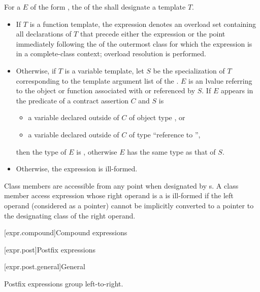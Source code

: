 \pnum
For a  $E$ of
the form ,
the  of
the 
shall designate a template $T$.
\begin{itemize}
\item
If $T$ is a function template,
the expression denotes an overload set containing all declarations of $T$
that precede either the expression or
the point immediately following the  of
the outermost class for which the expression is in a complete-class context;
overload resolution is performed.
\item
Otherwise, if $T$ is a variable template,
let $S$ be the specialization of $T$ corresponding to
the template argument list of the .
$E$ is an lvalue referring to
the object or function associated with or referenced by $S$.
If $E$ appears in the predicate of a contract assertion $C$
and $S$ is
\begin{itemize}
\item
a variable declared outside of $C$
of object type , or
\item
a variable declared outside of $C$
of type ``reference to '',
\end{itemize}
then the type of $E$ is ,
otherwise $E$ has the same type as that of $S$.
\item
Otherwise, the expression is ill-formed.
\end{itemize}
\begin{note}
Class members are accessible from any point
when designated by s.
A class member access expression
whose right operand is a  is ill-formed
if the left operand (considered as a pointer) cannot be implicitly converted
to a pointer to the designating class of the right operand.
\end{note}

[expr.compound]{Compound expressions}

[expr.post]{Postfix expressions}%

[expr.post.general]{General}%

\pnum
Postfix expressions group left-to-right.

